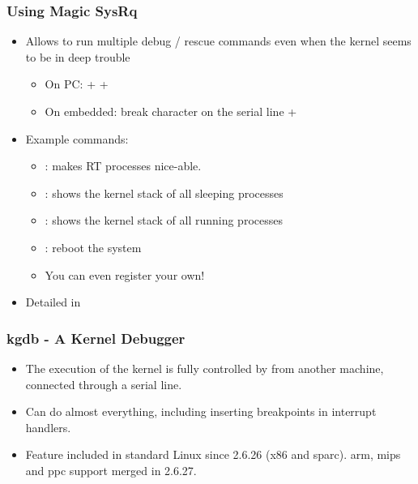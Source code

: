 \begin{frame}
  \frametitle{Using Magic SysRq}
  \begin{itemize}
  \item Allows to run multiple debug / rescue commands even when the
    kernel seems to be in deep trouble
    \begin{itemize}
    \item On PC: \code{[Alt]} + \code{[SysRq]} + 
    \item On embedded: break character on the serial line +
    \end{itemize}
  \item Example commands:
    \begin{itemize}
    \item {}: makes RT processes nice-able.
    \item {}: shows the kernel stack of all sleeping processes
    \item {}: shows the kernel stack of all running processes
    \item {}: reboot the system
    \item You can even register your own!
    \end{itemize}
  \item Detailed in 
  \end{itemize}
\end{frame}

\begin{frame}
  \frametitle{kgdb - A Kernel Debugger}
  \begin{itemize}
  \item The execution of the kernel is fully controlled by 
    from another machine, connected through a serial line.
  \item Can do almost everything, including inserting breakpoints in
    interrupt handlers.
  \item Feature included in standard Linux since 2.6.26 (x86 and
    sparc). arm, mips and ppc support merged in 2.6.27.
  \end{itemize}
\end{frame}

